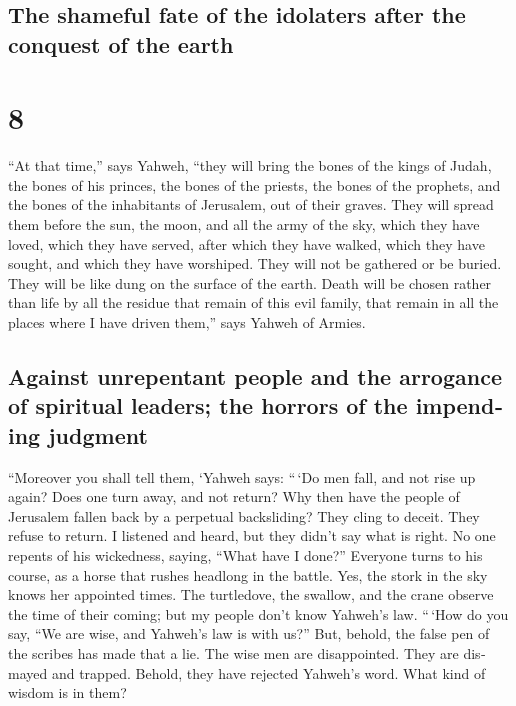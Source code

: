 \begin{paracol}{2}
\switchcolumn
\begin{otherlanguage}{english}

\hypertarget{the-shameful-fate-of-the-idolaters-after-the-conquest-of-the-earth}{%
\subsection{The shameful fate of the idolaters after the conquest of the
earth}\label{the-shameful-fate-of-the-idolaters-after-the-conquest-of-the-earth}}

\hypertarget{section-15}{%
\section{8}\label{section-15}}

 ``At that time,'' says Yahweh, ``they will bring the
bones of the kings of Judah, the bones of his princes, the bones of the
priests, the bones of the prophets, and the bones of the inhabitants of
Jerusalem, out of their graves.  They will spread them
before the sun, the moon, and all the army of the sky, which they have
loved, which they have served, after which they have walked, which they
have sought, and which they have worshiped. They will not be gathered or
be buried. They will be like dung on the surface of the earth.
 Death will be chosen rather than life by all the residue
that remain of this evil family, that remain in all the places where I
have driven them,'' says Yahweh of Armies.

\hypertarget{against-unrepentant-people-and-the-arrogance-of-spiritual-leaders-the-horrors-of-the-impending-judgment}{%
\subsection{Against unrepentant people and the arrogance of spiritual
leaders; the horrors of the impending
judgment}\label{against-unrepentant-people-and-the-arrogance-of-spiritual-leaders-the-horrors-of-the-impending-judgment}}

 ``Moreover you shall tell them, `Yahweh says: ``\,`Do men
fall, and not rise up again? Does one turn away, and not return?
 Why then have the people of Jerusalem fallen back by a
perpetual backsliding? They cling to deceit. They refuse to return.
 I listened and heard, but they didn't say what is right.
No one repents of his wickedness, saying, ``What have I done?'' Everyone
turns to his course, as a horse that rushes headlong in the battle.
 Yes, the stork in the sky knows her appointed times. The
turtledove, the swallow, and the crane observe the time of their coming;
but my people don't know Yahweh's law.  ``\,`How do you
say, ``We are wise, and Yahweh's law is with us?'' But, behold, the
false pen of the scribes has made that a lie.  The wise
men are disappointed. They are dismayed and trapped. Behold, they have
rejected Yahweh's word. What kind of wisdom is in them?


\end{otherlanguage}
\end{paracol}
